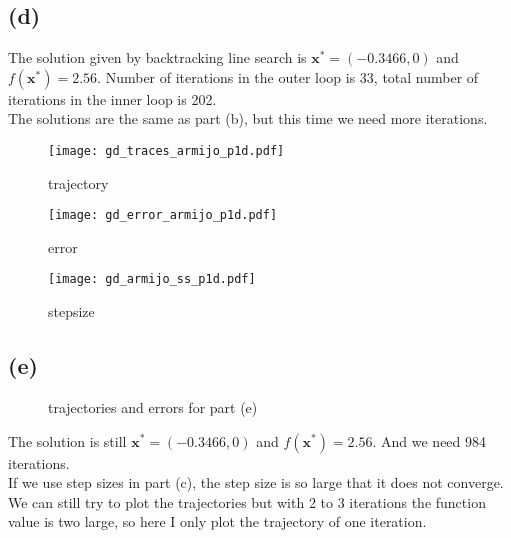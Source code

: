 \documentclass[12pt,letterpaper]{article}
\begin{document}
\newpage
\subsection*{(d)}
The solution given by backtracking line search is $\boldsymbol{x}^*=(-0.3466,0)$ and $f(\boldsymbol{x}^*)=2.56$. Number of iterations in the outer loop is 33, total number of iterations in the inner loop is 202.\\
The solutions are the same as part (b), but this time we need more iterations.
\begin{figure}[htbp]
\begin{minipage}[t]{0.3\linewidth}
\centering
\texttt{[image: gd\_traces\_armijo\_p1d.pdf]}
\caption{trajectory}
\end{minipage}%
\begin{minipage}[t]{0.3\linewidth}
\centering
\texttt{[image: gd\_error\_armijo\_p1d.pdf]}
\caption{error}
\end{minipage}
\begin{minipage}[t]{0.3\linewidth}
\centering
\texttt{[image: gd\_armijo\_ss\_p1d.pdf]}
\caption{stepsize}
\end{minipage}
\end{figure}

\newpage
\subsection*{(e)}
\begin{figure}[H]
\centering
{}
\caption{trajectories and errors for part (e)}
\label{tr2}
\end{figure}
The solution is still $\boldsymbol{x}^*=(-0.3466,0)$ and $f(\boldsymbol{x}^*)=2.56$. And we need 984 iterations.\\
If we use step sizes in part (c), the step size is so large that it does not converge. We can still try to plot the trajectories but with 2 to 3 iterations the function value is two large, so here I only plot the trajectory of one iteration.
\end{document}
